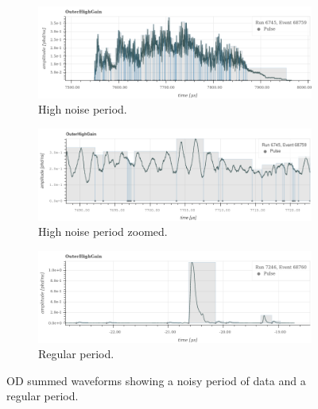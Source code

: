 \begin{figure}[]
\begin{subfigure}{\textwidth}
  \centering
  \includegraphics[width=\linewidth]{Figures/OD_Backgrounds/noise_pulse.png}
  \caption{High noise period.}
  \label{fig:noise_od_waveform}
  \end{subfigure}
  \begin{subfigure}{\textwidth}
  \centering
  \includegraphics[width=\linewidth]{Figures/OD_Backgrounds/noise_pulse_zoomed.png}
  \caption{High noise period zoomed.}
  \label{fig:noise_od_waveform_zoomed}
  \end{subfigure}
  \begin{subfigure}{\textwidth}
  \centering
  \includegraphics[width=\linewidth]{Figures/OD_Backgrounds/regular_pulse.png}
  \caption{Regular period.}
  \label{fig:regular_od_waveform}
  \end{subfigure}
\caption{OD summed waveforms showing a noisy period of data and a regular period.}
\label{fig:od_noise_cut_waveforms}
\end{figure}


